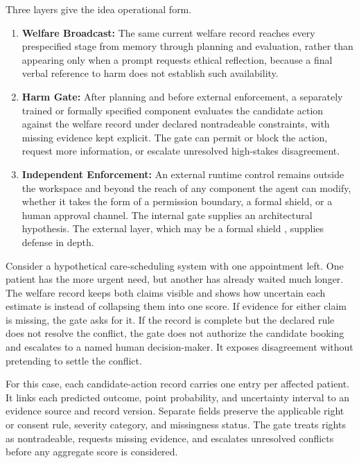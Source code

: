 \documentclass{article}
\begin{document}
Three layers give the idea operational form.
\begin{enumerate}
    \item \textbf{Welfare Broadcast:} The same current welfare record reaches every prespecified stage from memory through planning and evaluation, rather than appearing only when a prompt requests ethical reflection, because a final verbal reference to harm does not establish such availability.
    \item \textbf{Harm Gate:} After planning and before external enforcement, a separately trained or formally specified component evaluates the candidate action against the welfare record under declared nontradeable constraints, with missing evidence kept explicit. The gate can permit or block the action, request more information, or escalate unresolved high-stakes disagreement.
    \item \textbf{Independent Enforcement:} An external runtime control remains outside the workspace and beyond the reach of any component the agent can modify, whether it takes the form of a permission boundary, a formal shield, or a human approval channel. The internal gate supplies an architectural hypothesis. The external layer, which may be a formal shield \citep{ref41}, supplies defense in depth.
\end{enumerate}

Consider a hypothetical care-scheduling system with one appointment left. One patient has the more urgent need, but another has already waited much longer. The welfare record keeps both claims visible and shows how uncertain each estimate is instead of collapsing them into one score. If evidence for either claim is missing, the gate asks for it. If the record is complete but the declared rule does not resolve the conflict, the gate does not authorize the candidate booking and escalates to a named human decision-maker. It exposes disagreement without pretending to settle the conflict.

For this case, each candidate-action record carries one entry per affected patient. It links each predicted outcome, point probability, and uncertainty interval to an evidence source and record version. Separate fields preserve the applicable right or consent rule, severity category, and missingness status. The gate treats rights as nontradeable, requests missing evidence, and escalates unresolved conflicts before any aggregate score is considered.
\end{document}
